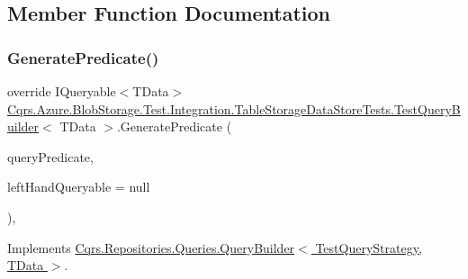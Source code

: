 \subsection{Member Function Documentation}
\mbox{\label{classCqrs_1_1Azure_1_1BlobStorage_1_1Test_1_1Integration_1_1TableStorageDataStoreTests_1_1TestQueryBuilder_a4b65d9a13c425df0aa5bd309fc1824de_a4b65d9a13c425df0aa5bd309fc1824de}} 
\subsubsection{\texorpdfstring{Generate\+Predicate()}{GeneratePredicate()}}
{\footnotesize\ttfamily override I\+Queryable$<$T\+Data$>$ \hyperlink{classCqrs_1_1Azure_1_1BlobStorage_1_1Test_1_1Integration_1_1TableStorageDataStoreTests_1_1TestQueryBuilder}{Cqrs.\+Azure.\+Blob\+Storage.\+Test.\+Integration.\+Table\+Storage\+Data\+Store\+Tests.\+Test\+Query\+Builder}$<$ T\+Data $>$.Generate\+Predicate (\begin{DoxyParamCaption}\item[{\hyperlink{classCqrs_1_1Repositories_1_1Queries_1_1QueryPredicate}{Query\+Predicate}}]{query\+Predicate,  }\item[{I\+Queryable$<$ T\+Data $>$}]{left\+Hand\+Queryable = {\ttfamily null} }\end{DoxyParamCaption})\hspace{0.3cm}{\ttfamily [protected]}, {\ttfamily [virtual]}}



Implements \hyperlink{classCqrs_1_1Repositories_1_1Queries_1_1QueryBuilder_aa38989a8b4808c7c73e7cf038b535ea7_aa38989a8b4808c7c73e7cf038b535ea7}{Cqrs.\+Repositories.\+Queries.\+Query\+Builder$<$ Test\+Query\+Strategy, T\+Data $>$}.

